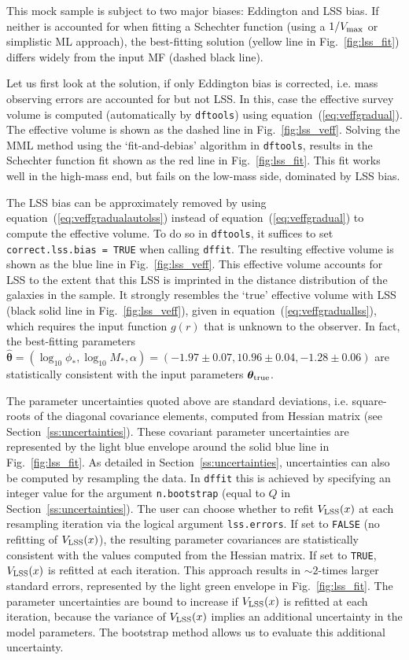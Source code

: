 \documentclass[a4paper,fleqn,usenatbib]{mnras}
\newcommand{\dftools}{\texttt{dftools}\xspace}
\newcommand{\vefflss}{V_{\rm LSS}}%
\newcommand{\vmax}{V_{\rm max}}
\newcommand{\fig}[1]{Fig.~\ref{fig:#1}}
\newcommand{\eq}[1]{equation~(\ref{eq:#1})}
\renewcommand{\ss}[1]{Section~\ref{ss:#1}}
\newcommand{\ie}{i.e.\xspace}
\newcommand{\para}{{\bm{\theta}}}
\begin{document}
This mock sample is subject to two major biases: Eddington and LSS bias. If neither is accounted for when fitting a Schechter function (using a $1/\vmax$ or simplistic ML approach), the best-fitting solution (yellow line in \fig{lss_fit}) differs widely from the input MF (dashed black line).

Let us first look at the solution, if only Eddington bias is corrected, \ie mass observing errors are accounted for but not LSS. In this, case the effective survey volume is computed (automatically by \dftools) using \eq{veffgradual}. The effective volume is shown as the dashed line in \fig{lss_veff}. Solving the MML method using the `fit-and-debias' algorithm in \dftools, results in the Schechter function fit shown as the red line in \fig{lss_fit}. This fit works well in the high-mass end, but fails on the low-mass side, dominated by LSS bias.

The LSS bias can be approximately removed by using \eq{veffgradualautolss} instead of \eq{veffgradual} to compute the effective volume. To do so in \dftools, it suffices to set \texttt{correct.lss.bias = TRUE} when calling \texttt{dffit}. The resulting effective volume is shown as the blue line in \fig{lss_veff}. This effective volume accounts for LSS to the extent that this LSS is imprinted in the distance distribution of the galaxies in the sample. It strongly resembles the `true' effective volume with LSS (black solid line in \fig{lss_veff}), given in \eq{veffgraduallss}, which requires the input function $g(r)$ that is unknown to the observer. In fact, the best-fitting parameters $\hat\para=(\log_{10}\phi_\ast,\log_{10}M_\ast,\alpha)=(-1.97\pm0.07,10.96\pm0.04,-1.28\pm0.06)$ are statistically consistent with the input parameters $\para_{\rm true}$.

The parameter uncertainties quoted above are standard deviations, \ie square-roots of the diagonal covariance elements, computed from Hessian matrix (see \ss{uncertainties}). These covariant parameter uncertainties are represented by the light blue envelope around the solid blue line in \fig{lss_fit}. As detailed in \ss{uncertainties}, uncertainties can also be computed by resampling the data. In \texttt{dffit} this is achieved by specifying an integer value for the argument \texttt{n.bootstrap} (equal to $Q$ in \ss{uncertainties}). The user can choose whether to refit $\vefflss(x)$ at each resampling iteration via the logical argument \texttt{lss.errors}. If set to \texttt{FALSE} (no refitting of $\vefflss(x)$), the resulting parameter covariances are statistically consistent with the values computed from the Hessian matrix. If set to \texttt{TRUE}, $\vefflss(x)$ is refitted at each iteration. This approach results in $\sim2$-times larger standard errors, represented by the light green envelope in \fig{lss_fit}. The parameter uncertainties are bound to increase if $\vefflss(x)$ is refitted at each iteration, because the variance of $\vefflss(x)$ implies an additional uncertainty in the model parameters. The bootstrap method allows us to evaluate this additional uncertainty.
\end{document}
